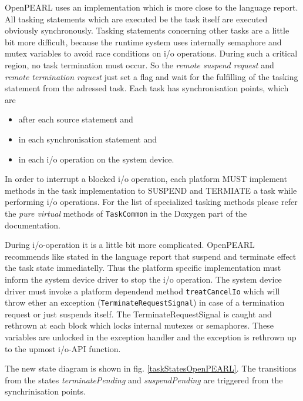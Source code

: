 OpenPEARL uses an implementation which is more close to the language report.
All tasking statements which are executed be the task itself are executed 
obviously synchronously.
Tasking statements concerning other tasks are a little 
bit more difficult, because the runtime system uses internally semaphore
 and mutex
variables to avoid race conditions on i/o operations.
During such a critical region,
no task termination must occur. So the  {\em remote suspend request} and 
{\em remote termination request} just set a flag and wait for the fulfilling
 of the 
tasking statement from the adressed task. Each task has synchronisation points,
which are
\begin{itemize}
\item  after each source statement and
\item  in each synchronisation statement and 
\item in each i/o operation on the system device.
\end{itemize}
In order to interrupt a blocked i/o operation, each platform MUST implement 
methods in the task implementation to SUSPEND and TERMIATE a task while 
performing i/o operations.
For the list of specialized tasking methods please refer the
{\em pure virtual} methods of \verb|TaskCommon| in the Doxygen
part of the documentation.

During i/o-operation it is a little bit more complicated. OpenPEARL
recommends like stated in the language report that suspend and terminate
effect the task state immediatelly. Thus the platform specific implementation
must inform the system device driver to stop the i/o operation.
The system device driver must invoke a platform dependend method
\verb|treatCancelIo| which will throw ether an exception
(\verb|TerminateRequestSignal|) in case of a termination request
 or just suspends itself.
The TerminateRequestSignal is caught and rethrown at each block which 
locks internal mutexes or semaphores. These variables are unlocked in
the exception handler and the exception is rethrown up to the upmost i/o-API
function.

The new state diagram is shown in 
fig. \ref{taskStatesOpenPEARL}.
The transitions from the  states {\em terminatePending} and 
{\em suspendPending}  are triggered from the synchrinisation points.

